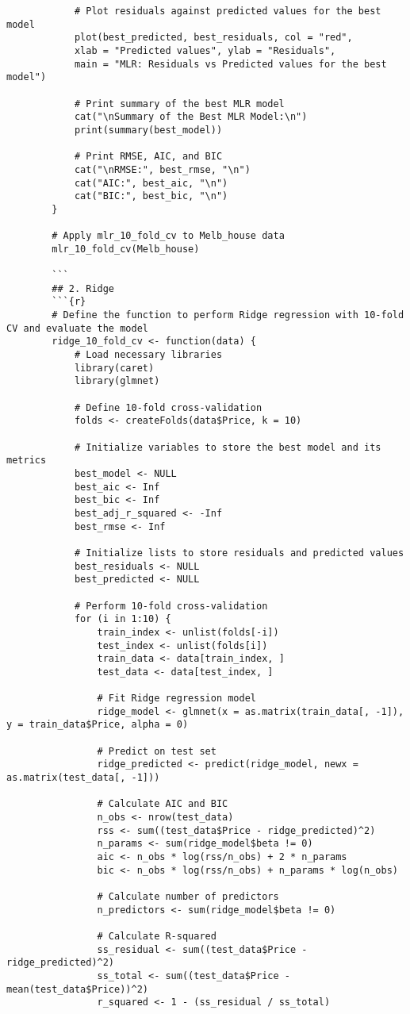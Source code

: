 \documentclass[12pt,doublespace]{article}
\begin{document}
\begin{lstlisting}
			# Plot residuals against predicted values for the best model
			plot(best_predicted, best_residuals, col = "red",
			xlab = "Predicted values", ylab = "Residuals", 
			main = "MLR: Residuals vs Predicted values for the best model")
			
			# Print summary of the best MLR model
			cat("\nSummary of the Best MLR Model:\n")
			print(summary(best_model))
			
			# Print RMSE, AIC, and BIC
			cat("\nRMSE:", best_rmse, "\n")
			cat("AIC:", best_aic, "\n")
			cat("BIC:", best_bic, "\n")
		}
		
		# Apply mlr_10_fold_cv to Melb_house data
		mlr_10_fold_cv(Melb_house)
		
		```
		## 2. Ridge
		```{r}
		# Define the function to perform Ridge regression with 10-fold CV and evaluate the model
		ridge_10_fold_cv <- function(data) {
			# Load necessary libraries
			library(caret)
			library(glmnet)
			
			# Define 10-fold cross-validation
			folds <- createFolds(data$Price, k = 10)
			
			# Initialize variables to store the best model and its metrics
			best_model <- NULL
			best_aic <- Inf
			best_bic <- Inf
			best_adj_r_squared <- -Inf
			best_rmse <- Inf
			
			# Initialize lists to store residuals and predicted values
			best_residuals <- NULL
			best_predicted <- NULL
			
			# Perform 10-fold cross-validation
			for (i in 1:10) {
				train_index <- unlist(folds[-i])
				test_index <- unlist(folds[i])
				train_data <- data[train_index, ]
				test_data <- data[test_index, ]
				
				# Fit Ridge regression model
				ridge_model <- glmnet(x = as.matrix(train_data[, -1]), y = train_data$Price, alpha = 0)
				
				# Predict on test set
				ridge_predicted <- predict(ridge_model, newx = as.matrix(test_data[, -1]))
				
				# Calculate AIC and BIC
				n_obs <- nrow(test_data)
				rss <- sum((test_data$Price - ridge_predicted)^2)
				n_params <- sum(ridge_model$beta != 0)
				aic <- n_obs * log(rss/n_obs) + 2 * n_params
				bic <- n_obs * log(rss/n_obs) + n_params * log(n_obs)
				
				# Calculate number of predictors
				n_predictors <- sum(ridge_model$beta != 0)
				
				# Calculate R-squared
				ss_residual <- sum((test_data$Price - ridge_predicted)^2)
				ss_total <- sum((test_data$Price - mean(test_data$Price))^2)
				r_squared <- 1 - (ss_residual / ss_total)
				

\end{lstlisting}
\end{document}
